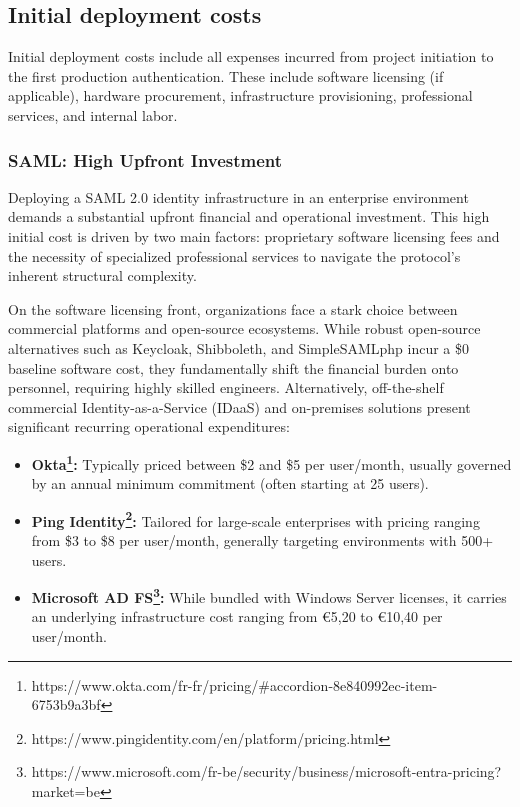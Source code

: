 \documentclass[../memoire.tex]{subfiles}
\begin{document}
\subsection{Initial deployment costs}

Initial deployment costs include all expenses incurred from project initiation to the first production authentication. These include software licensing (if applicable), hardware procurement, infrastructure provisioning, professional services, and internal labor.

\subsubsection{SAML: High Upfront Investment}

Deploying a SAML 2.0 identity infrastructure in an enterprise environment demands a substantial upfront financial and operational investment. This high initial cost is driven by two main factors: proprietary software licensing fees and the necessity of specialized professional services to navigate the protocol's inherent structural complexity.

On the software licensing front, organizations face a stark choice between commercial platforms and open-source ecosystems. While robust open-source alternatives such as Keycloak, Shibboleth, and SimpleSAMLphp incur a \$0 baseline software cost, they fundamentally shift the financial burden onto personnel, requiring highly skilled engineers. Alternatively, off-the-shelf commercial Identity-as-a-Service (IDaaS) and on-premises solutions present significant recurring operational expenditures:
\begin{itemize}
    \item \textbf{Okta\footnote{https://www.okta.com/fr-fr/pricing/\#accordion-8e840992ec-item-6753b9a3bf}:} Typically priced between \$2 and \$5 per user/month, usually governed by an annual minimum commitment (often starting at 25 users).
    \item \textbf{Ping Identity\footnote{https://www.pingidentity.com/en/platform/pricing.html}:} Tailored for large-scale enterprises with pricing ranging from \$3 to \$8 per user/month, generally targeting environments with 500+ users.
    \item \textbf{Microsoft AD FS\footnote{https://www.microsoft.com/fr-be/security/business/microsoft-entra-pricing?market=be}:} While bundled with Windows Server licenses, it carries an underlying infrastructure cost ranging from €5,20 to €10,40 per user/month. 
\end{itemize}
\end{document}
